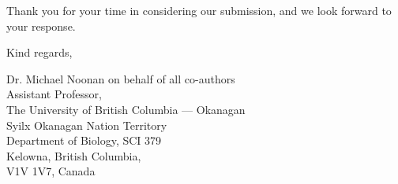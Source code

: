 \documentclass{article}
\begin{document}
Thank you for your time in considering our submission, and we look forward to your response.

Kind regards,
\vspace{30pt}

Dr. Michael Noonan on behalf of all co-authors\\
Assistant Professor,  \\
The University of British Columbia — Okanagan\\
Syilx Okanagan Nation Territory\\
Department of Biology, SCI 379\\
Kelowna, British Columbia,\\
V1V 1V7, Canada\\
\end{document}
